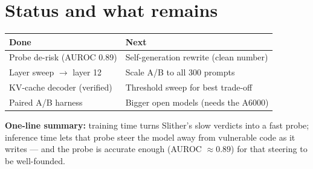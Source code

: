 \documentclass[11pt]{article}
\begin{document}
\section{Status and what remains}
\begin{center}
\begin{tabular}{@{}ll@{}}
\toprule
\textbf{Done} & \textbf{Next} \\
\midrule
Probe de-risk (AUROC 0.89) & Self-generation rewrite (clean number) \\
Layer sweep $\rightarrow$ layer 12 & Scale A/B to all 300 prompts \\
KV-cache decoder (verified) & Threshold sweep for best trade-off \\
Paired A/B harness & Bigger open models (needs the A6000) \\
\bottomrule
\end{tabular}
\end{center}

\noindent \textbf{One-line summary:} training time turns Slither's slow verdicts
into a fast probe; inference time lets that probe steer the model away from
vulnerable code as it writes --- and the probe is accurate enough (AUROC
$\approx 0.89$) for that steering to be well-founded.
\end{document}
